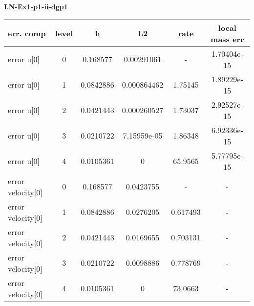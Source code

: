 \documentclass{amsart}
\begin{document}
\begin{center}   
{\bf LN-Ex1-p1-ii-dgp1 }\end{center}  
\tableofcontents

\begin{table}[h!]
\begin{tabular}{|l|c|c|c|c|c|}
\hline
err. comp & level & h  & L2 & rate  & local mass err \\ 
\hline
error u[0] & 0 & 0.168577  & 0.00291061 & -   &  1.70404e-15 \\ 
error u[0] & 1 & 0.0842886 & 0.000864462 & 1.75145   &  1.89229e-15 \\ 
error u[0] & 2 & 0.0421443 & 0.000260527 & 1.73037   &  2.92527e-15 \\ 
error u[0] & 3 & 0.0210722 & 7.15959e-05 & 1.86348   &  6.92336e-15 \\ 
error u[0] & 4 & 0.0105361 & 0 & 65.9565   &  5.77795e-15 \\ 
error velocity[0] & 0 & 0.168577  & 0.0423755 & -   & - \\ 
error velocity[0] & 1 & 0.0842886 & 0.0276205 & 0.617493   & - \\ 
error velocity[0] & 2 & 0.0421443 & 0.0169655 & 0.703131   & - \\ 
error velocity[0] & 3 & 0.0210722 & 0.0098886 & 0.778769   & - \\ 
error velocity[0] & 4 & 0.0105361 & 0 & 73.0663   & - \\ 

\hline
\end{tabular}
\end{table}
\end{document}
